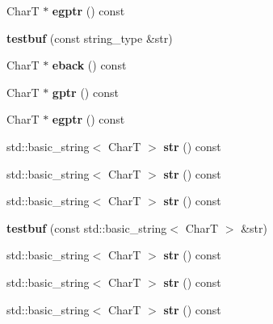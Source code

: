 \begin{DoxyCompactItemize}
CharT $\ast$ {\bfseries egptr} () const
\item 
\mbox{\label{structtestbuf_af4500052e14c24781929e2e23a03b7f4}} 
{\bfseries testbuf} (const string\+\_\+type \&str)
\item 
\mbox{\label{structtestbuf_a1f4df16dc86bc40a9af64b5fff87cef0}} 
CharT $\ast$ {\bfseries eback} () const
\item 
\mbox{\label{structtestbuf_a30875f59e62daf2cf38ec0cd7e79ee68}} 
CharT $\ast$ {\bfseries gptr} () const
\item 
\mbox{\label{structtestbuf_a3aaa639283f34387537715800c38e416}} 
CharT $\ast$ {\bfseries egptr} () const
\item 
\mbox{\label{structtestbuf_a077afc7549a2a7a21f840ba884695eab}} 
std\+::basic\+\_\+string$<$ CharT $>$ {\bfseries str} () const
\item 
\mbox{\label{structtestbuf_a077afc7549a2a7a21f840ba884695eab}} 
std\+::basic\+\_\+string$<$ CharT $>$ {\bfseries str} () const
\item 
\mbox{\label{structtestbuf_a077afc7549a2a7a21f840ba884695eab}} 
std\+::basic\+\_\+string$<$ CharT $>$ {\bfseries str} () const
\item 
\mbox{\label{structtestbuf_aade97a7fab3e46f2b3d604917be590a8}} 
{\bfseries testbuf} (const std\+::basic\+\_\+string$<$ CharT $>$ \&str)
\item 
\mbox{\label{structtestbuf_a077afc7549a2a7a21f840ba884695eab}} 
std\+::basic\+\_\+string$<$ CharT $>$ {\bfseries str} () const
\item 
\mbox{\label{structtestbuf_a077afc7549a2a7a21f840ba884695eab}} 
std\+::basic\+\_\+string$<$ CharT $>$ {\bfseries str} () const
\item 
\mbox{\label{structtestbuf_a077afc7549a2a7a21f840ba884695eab}} 
std\+::basic\+\_\+string$<$ CharT $>$ {\bfseries str} () const
\item 
\mbox{\label{structtestbuf_a077afc7549a2a7a21f840ba884695eab}} 

\end{DoxyCompactItemize}
